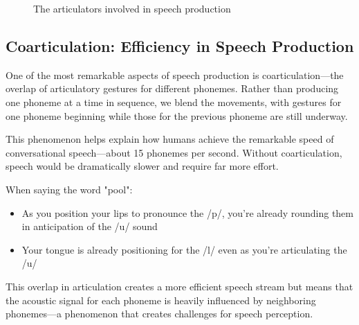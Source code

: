 \documentclass[12pt,a4paper]{article}
\begin{document}
\begin{figure}[h]
\centering
{}
\caption{The articulators involved in speech production}
\label{fig:articulators}
\end{figure}

\subsection{Coarticulation: Efficiency in Speech Production}

One of the most remarkable aspects of speech production is coarticulation—the overlap of articulatory gestures for different phonemes. Rather than producing one phoneme at a time in sequence, we blend the movements, with gestures for one phoneme beginning while those for the previous phoneme are still underway.

This phenomenon helps explain how humans achieve the remarkable speed of conversational speech—about 15 phonemes per second. Without coarticulation, speech would be dramatically slower and require far more effort.

\begin{tcolorbox}[enhanced, colback=orange!5, colframe=orange!75!black, title=Coarticulation: The Blending of Gestures]
When saying the word "pool":
\begin{itemize}
\item As you position your lips to pronounce the /p/, you're already rounding them in anticipation of the /u/ sound
\item Your tongue is already positioning for the /l/ even as you're articulating the /u/
\end{itemize}

This overlap in articulation creates a more efficient speech stream but means that the acoustic signal for each phoneme is heavily influenced by neighboring phonemes—a phenomenon that creates challenges for speech perception.
\end{tcolorbox}
\end{document}
